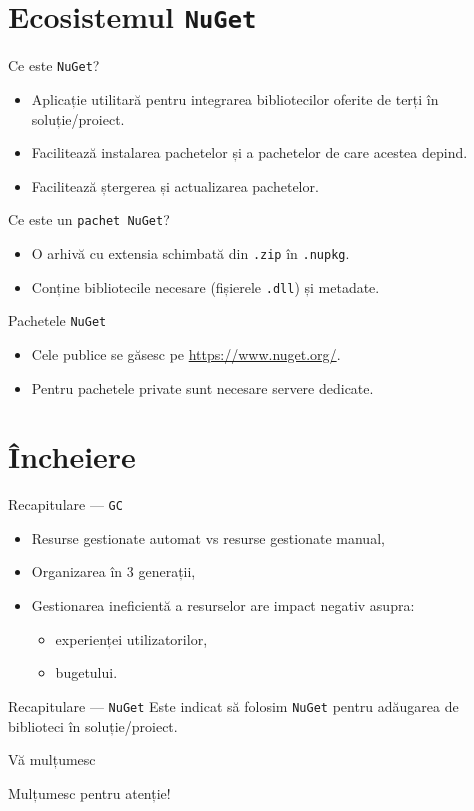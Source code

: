 \documentclass[presentation]{beamer}
\begin{document}
\section{Ecosistemul \texttt{NuGet}}
\label{sec:org62f5a03}
\begin{frame}[label={sec:org52e88e1},fragile]{Ce este \texttt{NuGet}?}
 \begin{itemize}
\item Aplicație utilitară pentru integrarea bibliotecilor oferite de terți în soluție/proiect.
\item Facilitează instalarea pachetelor și a pachetelor de care acestea depind.
\item Facilitează ștergerea și actualizarea pachetelor.
\end{itemize}
\end{frame}
\begin{frame}[label={sec:orgffdee22},fragile]{Ce este un \texttt{pachet NuGet}?}
 \begin{itemize}
\item O arhivă cu extensia schimbată din \texttt{.zip} în \texttt{.nupkg}.
\item Conține bibliotecile necesare (fișierele \texttt{.dll}) și metadate.
\end{itemize}
\end{frame}
\begin{frame}[label={sec:org63c7437},fragile]{Pachetele \texttt{NuGet}}
 \begin{itemize}
\item Cele publice se găsesc pe \url{https://www.nuget.org/}.
\item Pentru pachetele private sunt necesare servere dedicate.
\end{itemize}
\end{frame}
\section{Încheiere}
\label{sec:orgba9589e}
\begin{frame}[label={sec:orgc98f7d3},fragile]{Recapitulare --- \texttt{GC}}
 \begin{itemize}
\item Resurse gestionate automat vs resurse gestionate manual,
\item Organizarea în 3 generații,
\item Gestionarea ineficientă a resurselor are impact negativ asupra:
\begin{itemize}
\item experienței utilizatorilor,
\item bugetului.
\end{itemize}
\end{itemize}
\end{frame}
\begin{frame}[label={sec:orgc1a9e77},fragile]{Recapitulare --- \texttt{NuGet}}
 Este indicat să folosim \texttt{NuGet} pentru adăugarea de biblioteci în soluție/proiect.
\end{frame}
\begin{frame}[label={sec:orgba83173}]{Vă mulțumesc}
\begin{center}
Mulțumesc pentru atenție!
\end{center}
\end{frame}
\end{document}
